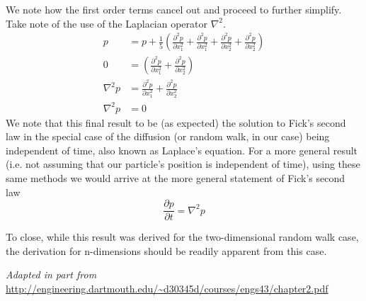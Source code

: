We note how the first order terms cancel out and proceed to further simplify. Take note of the use of the Laplacian operator $\nabla^2$.
\begin{align*}
    p &= p + \frac{1}{5}\left(\frac{\partial^2 p}{\partial x_1^2}+\frac{\partial^2 p}{\partial x_1^2}+\frac{\partial^2 p}{\partial x_2^2}+\frac{\partial^2 p}{\partial x_2^2}\right) \\
    0 &= \left(\frac{\partial^2 p}{\partial x_1^2}+\frac{\partial^2 p}{\partial x_2^2}\right)\\
    \nabla^2 p &= \frac{\partial^2 p}{\partial x_1^2}+\frac{\partial^2 p}{\partial x_2^2}\\
    \nabla^2 p &= 0
\end{align*}
We note that this final result to be (as expected) the solution to Fick's second law in the special case of the diffusion (or random walk, in our case) being independent of time, also known as Laplace's equation. For a more general result (i.e. not assuming that our particle's position is independent of time), using these same methods we would arrive at the more general statement of Fick's second law
$$\frac{\partial p}{\partial t} = \nabla^2 p$$

To close, while this result was derived for the two-dimensional random walk case, the derivation for n-dimensions should be readily apparent from this case.


\vspace{12pt}


{\it Adapted in part from} \url{http://engineering.dartmouth.edu/~d30345d/courses/engs43/chapter2.pdf}